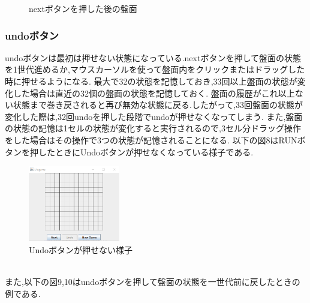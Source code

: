 \documentclass[dvipdfmx]{jarticle}
\begin{document}
\begin{figure}[htbp]
\begin{minipage}[b]{0.45\linewidth}
    \caption{nextボタンを押した後の盤面}
  \end{minipage}
\end{figure}
\subsubsection{undoボタン}
undoボタンは最初は押せない状態になっている.nextボタンを押して盤面の状態を1世代進めるか,マウスカーソルを使って盤面内をクリックまたはドラッグした時に押せるようになる.
最大で32の状態を記憶しておき,33回以上盤面の状態が変化した場合は直近の32個の盤面の状態を記憶しておく.
盤面の履歴がこれ以上ない状態まで巻き戻されると再び無効な状態に戻る.したがって,33回盤面の状態が変化した際は,32回undoを押した段階でundoが押せなくなってしまう.
また,盤面の状態の記憶は1セルの状態が変化すると実行されるので,3セル分ドラッグ操作をした場合はその操作で3つの状態が記憶されることになる.
以下の図8はRUNボタンを押したときにUndoボタンが押せなくなっている様子である.
\begin{figure}[h]
  \centering
  \includegraphics[width=4cm]{panel_normal.png}
  \caption{Undoボタンが押せない様子}
\end{figure}
\\また,以下の図9,10はundoボタンを押して盤面の状態を一世代前に戻したときの例である.
\end{document}
